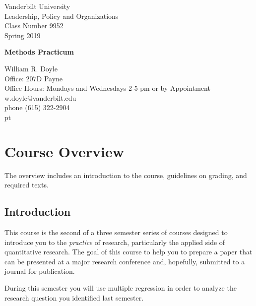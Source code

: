 \documentclass[12pt]{article}
\begin{document}


\thispagestyle{empty}%


\setlength{\parskip}{1ex plus 0.5ex minus 0.2ex}

\setcounter{secnumdepth}{-2}



\begin{flushleft}
Vanderbilt University\\
Leadership, Policy and Organizations\\
Class Number 9952\\ 
Spring 2019\\
\end{flushleft}

\begin{center}
\Large{\textbf{Methods Practicum}}\\
\end{center}

\begin{flushleft}
William R. Doyle\\
Office: 207D Payne\\
Office Hours: Mondays and Wednesdays 2-5 pm or by Appointment \\
w.doyle@vanderbilt.edu\\
phone (615) 322-2904\\

 pt

\end{flushleft}

\section{Course Overview}%

The overview includes an introduction to the course, guidelines on grading, and required texts.

\subsection{Introduction}%
\begin{flushleft}

  This course is the second of a three semester series of courses
  designed to introduce you to the \textit{practice} of research,
  particularly the applied side of quantitative research. The goal of
  this course to help you to prepare a paper that can be presented at
  a major research conference and, hopefully, submitted to a journal
  for publication.


  During this semester you will use multiple regression in order to
  analyze the research question you identified last semester.
  
\end{flushleft}
\end{document}
